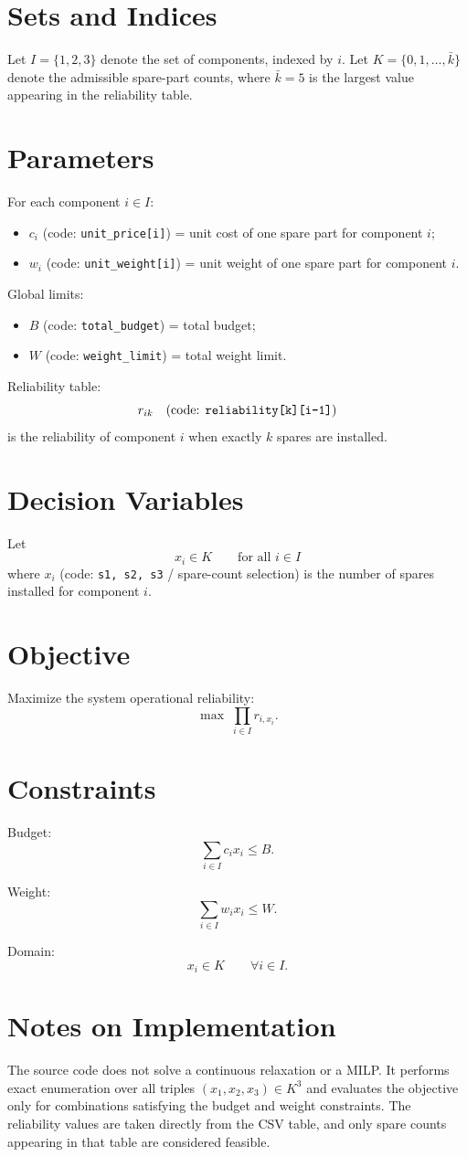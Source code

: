 \section*{Sets and Indices}
Let $I=\{1,2,3\}$ denote the set of components, indexed by $i$.
Let $K=\{0,1,\dots,\bar{k}\}$ denote the admissible spare-part counts, where $\bar{k}=5$ is the largest value appearing in the reliability table.

\section*{Parameters}
For each component $i\in I$:
\begin{itemize}
  \item $c_i$ (code: \texttt{unit\_price[i]}) = unit cost of one spare part for component $i$;
  \item $w_i$ (code: \texttt{unit\_weight[i]}) = unit weight of one spare part for component $i$.
\end{itemize}
Global limits:
\begin{itemize}
  \item $B$ (code: \texttt{total\_budget}) = total budget;
  \item $W$ (code: \texttt{weight\_limit}) = total weight limit.
\end{itemize}
Reliability table:
\[
r_{ik} \quad \text{(code: \texttt{reliability[k][i-1]})}
\]
is the reliability of component $i$ when exactly $k$ spares are installed.

\section*{Decision Variables}
Let
\[
x_i \in K \qquad \text{for all } i\in I
\]
where $x_i$ (code: \texttt{s1, s2, s3} / spare-count selection) is the number of spares installed for component $i$.

\section*{Objective}
Maximize the system operational reliability:
\[
\max \; \prod_{i\in I} r_{i,x_i}.
\]

\section*{Constraints}
Budget:
\[
\sum_{i\in I} c_i x_i \le B.
\]

Weight:
\[
\sum_{i\in I} w_i x_i \le W.
\]

Domain:
\[
x_i \in K \qquad \forall i\in I.
\]

\section*{Notes on Implementation}
The source code does not solve a continuous relaxation or a MILP. It performs exact enumeration over all triples $(x_1,x_2,x_3)\in K^3$ and evaluates the objective only for combinations satisfying the budget and weight constraints. The reliability values are taken directly from the CSV table, and only spare counts appearing in that table are considered feasible.

